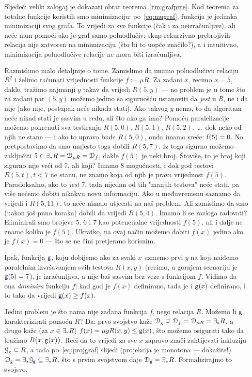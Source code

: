 Sljedeći veliki zalogaj je dokazati obrat teorema~\ref{tm:grafprre}. Kod teorema za totalne funkcije koristili smo minimizaciju: po~\eqref{eq:mugraf}, funkcija je jednaka minimizaciji svog grafa. To vrijedi za sve funkcije (čak i za neizračunljive), ali neće nam pomoći ako je graf samo poluodlučiv: skup rekurzivno prebrojivih relacija nije zatvoren na minimizaciju (što bi to uopće značilo?), a i intuitivno, minimizacija poluodlučive relacije ne mora biti izračunljiva.

Razmislimo malo detaljnije o tome. Zamislimo da imamo poluodlučivu relaciju $R^2$ i želimo računati vrijednosti funkcije $f:=\mu R$. Za zadani $x$, recimo $x=5$, dakle, tražimo najmanji $y$ takav da vrijedi $R(5,y)$ --- no problem je u tome što za zadani par $(5,y)$ možemo jedino sa sigurnošću ustanoviti da \emph{jest} u $R$, ne i da nije (ako nije, postupak neće nikada stati). Ako takvog $y$ nema, to da algoritam neće nikad stati je sasvim u redu, ali što ako ga ima? Pomoću paralelizacije možemo pokrenuti sva testiranja $R(5,0)$, $R(5,1)$, $R(5,2)$,~\ldots\ dok neko od njih ne stane --- i ako to upravo bude $R(5,0)$, onda imamo sreće: $\f f(5)=0$. No pretpostavimo da smo umjesto toga dobili $R(5,7)$. Iz toga sigurno možemo zaključiti $5\in\exists_*R=\mathcal D_{\mu R}=\mathcal D_{f}$, dakle $f(5)$ je neki broj. Štoviše, to je broj koji sigurno nije veći od $7$, ali koji? Imamo $8$ mogućnosti, i dok god testovi $R(5,t),t<7$ ne stanu, ne znamo koja od njih je prava vrijednost $f(5)$. Paradoksalno, ako to \emph{jest} $7$, tada nijedan od tih "manjih testova" neće stati, pa više nećemo dobiti nikakvu novu informaciju. Ako u međuvremenu saznamo da vrijedi i $R(5,11)$, to neće nimalo utjecati na naš problem. Ali zamislimo da smo (nakon još puno koraka) dobili da vrijedi $R(5,4)$. Imamo li se razloga radovati? Eliminirali smo brojeve $5$, $6$ i $7$ kao potencijalne vrijednosti $f(5)$, ali i dalje ne znamo koliko je $f(5)$. Ukratko, na ovaj način možemo dobiti $f(x)$ jedino ako je $f(x)=0$ --- što se ne čini pretjerano korisnim.

Ipak, funkcija $\f g$, koju dobijemo ako za svaki $x$ uzmemo prvi $y$ na koji naiđemo paralelnim izvršavanjem svih testova $R(x,y)$ (recimo, u gornjem scenariju je $\f g(5)=7$), je izračunljiva, a nije baš sasvim bez veze s funkcijom $f$. Vidimo da ona \emph{dominira} funkciju $f$: kad god je $f(x)$ definirano, tada je i $\f g(x)$ definirano, i to tako da vrijedi $\f g(x)\ge f(x)$.

Jedini problem je što nama nije zadana funkcija $f$, nego relacija $R$. Možemo li $\f g$ karakterizirati pomoću $R$? Da: prvo svojstvo kaže $\dom{\f g}\supseteq\dom f=\dom{\mu R}=\exists_*R$, a drugo kaže (za $x\in\exists_*R$) $f(x)=\mu yR(x,y)\le\f g(x)$, što možemo osigurati tako da tražimo $R\bigl(x,\f g(x)\bigr)$. Reći da to vrijedi za sve $x$ zapravo znači zahtijevati inkluziju $\graf{\f g}\subseteq R$, a tada po~\eqref{eq:projgraf} slijedi (projekcija je monotona --- dokažite!) $\dom{\f g}=\exists_*\graf{\f g}\subseteq\exists_*R$, što s prvim svojstvom daje $\dom{\f g}=\exists_*R$. Formalizirajmo to svojsvo.

